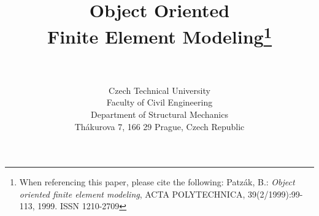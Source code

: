 
\newcommand{\class}[1]{{\bf #1}}
\newcommand{\service}[1]{{\em #1}}

\title{Object Oriented\\ Finite Element Modeling\footnote{When
referencing this paper, please cite the following: Patz\'{a}k, B.:
{\em Object oriented finite element modeling}, ACTA POLYTECHNICA, 39(2/1999):99-113, 1999. ISSN 1210-2709}}
\author{\bp \\ \\
Czech Technical University\\
Faculty of Civil Engineering\\
Department of Structural Mechanics\\
Th\'akurova 7, 166 29 Prague, Czech Republic
}
\maketitle
